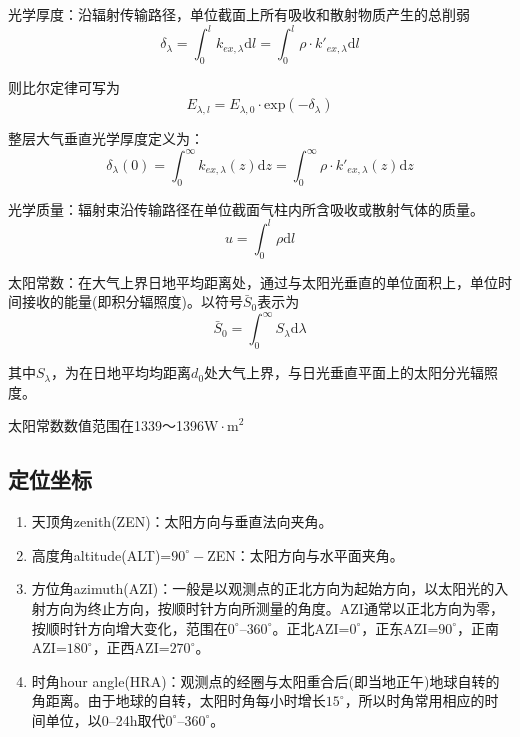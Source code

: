 \documentclass[UTF8,a4paper,11pt,oneside]{ctexbook}
\begin{document}
光学厚度：沿辐射传输路径，单位截面上所有吸收和散射物质产生的总削弱
\begin{equation}
\delta_\lambda=\int_0^lk_{ex,\lambda}\mathrm{d}l=\int_{0}^{l}\rho\cdot{}k'_{ex,\lambda}\mathrm{d}l
\end{equation}

则比尔定律可写为
\begin{equation}
E_{\lambda,l}=E_{\lambda,0}\cdot{}\mathrm{exp}(-\delta_\lambda)
\end{equation}

整层大气垂直光学厚度定义为：
\begin{equation}
\delta_\lambda(0)=\int_{0}^{\infty}k_{ex,\lambda}(z)\mathrm{d}z=\int_{0}^{\infty}\rho\cdot{}k'_{ex,\lambda}(z)\mathrm{d}z
\end{equation}

光学质量：辐射束沿传输路径在单位截面气柱内所含吸收或散射气体的质量。
\begin{equation}
u=\int_{0}^{l}\rho\mathrm{d}l
\end{equation}

太阳常数：在大气上界日地平均距离处，通过与太阳光垂直的单位面积上，单位时间接收的能量(即积分辐照度)。以符号\(\bar{S}_0\)表示为
\begin{equation}
\bar{S}_0=\int_{0}^{\infty}S_\lambda\mathrm{d}\lambda
\end{equation}

其中\(S_\lambda\)，为在日地平均均距离\(d_0\)处大气上界，与日光垂直平面上的太阳分光辐照度。

太阳常数数值范围在1339～1396\(\mathrm{W\cdot{}m}^2\)

\subsection{定位坐标}
\begin{enumerate}
    \item 天顶角zenith(ZEN)：太阳方向与垂直法向夹角。
    \item 高度角altitude(ALT)=\(90^\circ-\)ZEN：太阳方向与水平面夹角。
    \item 方位角azimuth(AZI)：一般是以观测点的正北方向为起始方向，以太阳光的入射方向为终止方向，按顺时针方向所测量的角度。AZI通常以正北方向为零，按顺时针方向增大变化，范围在\(0^\circ\)--\(360^\circ\)。正北AZI=\(0^\circ\)，正东AZI=\(90^\circ\)，正南AZI=\(180^\circ\)，正西AZI=\(270^\circ\)。
    \item 时角hour angle(HRA)：观测点的经圈与太阳重合后(即当地正午)地球自转的角距离。由于地球的自转，太阳时角每小时增长\(15^\circ\)，所以时角常用相应的时间单位，以0--24h取代\(0^\circ\)--\(360^\circ\)。
\end{enumerate}
\end{document}
